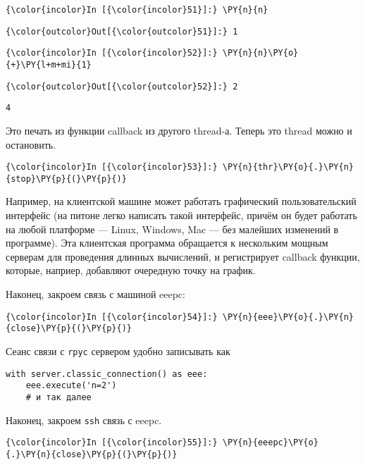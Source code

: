     \begin{Verbatim}[commandchars=\\\{\}]
{\color{incolor}In [{\color{incolor}51}]:} \PY{n}{n}
\end{Verbatim}


\begin{Verbatim}[commandchars=\\\{\}]
{\color{outcolor}Out[{\color{outcolor}51}]:} 1
\end{Verbatim}
            
    \begin{Verbatim}[commandchars=\\\{\}]
{\color{incolor}In [{\color{incolor}52}]:} \PY{n}{n}\PY{o}{+}\PY{l+m+mi}{1}
\end{Verbatim}


\begin{Verbatim}[commandchars=\\\{\}]
{\color{outcolor}Out[{\color{outcolor}52}]:} 2
\end{Verbatim}
            
    \begin{Verbatim}[commandchars=\\\{\}]
4

    \end{Verbatim}

    Это печать из функции callback из другого thread-а. Теперь это thread
можно и остановить.

    \begin{Verbatim}[commandchars=\\\{\}]
{\color{incolor}In [{\color{incolor}53}]:} \PY{n}{thr}\PY{o}{.}\PY{n}{stop}\PY{p}{(}\PY{p}{)}
\end{Verbatim}


    Например, на клиентской машине может работать графический
пользовательский интерфейс (на питоне легко написать такой интерфейс,
причём он будет работать на любой платформе --- Linux, Windows, Mac --- без
малейших изменений в программе). Эта клиентская программа обращается к
нескольким мощным серверам для проведения длинных вычислений, и
регистрирует callback функции, которые, наприер, добавляют очередную
точку на график.

Наконец, закроем связь с машиной eeepc:

    \begin{Verbatim}[commandchars=\\\{\}]
{\color{incolor}In [{\color{incolor}54}]:} \PY{n}{eee}\PY{o}{.}\PY{n}{close}\PY{p}{(}\PY{p}{)}
\end{Verbatim}


    Сеанс связи с \texttt{rpyc} сервером удобно записывать как

\begin{verbatim}
with server.classic_connection() as eee:
    eee.execute('n=2')
    # и так далее
\end{verbatim}

Наконец, закроем \texttt{ssh} связь с eeepc.

    \begin{Verbatim}[commandchars=\\\{\}]
{\color{incolor}In [{\color{incolor}55}]:} \PY{n}{eeepc}\PY{o}{.}\PY{n}{close}\PY{p}{(}\PY{p}{)}
\end{Verbatim}
